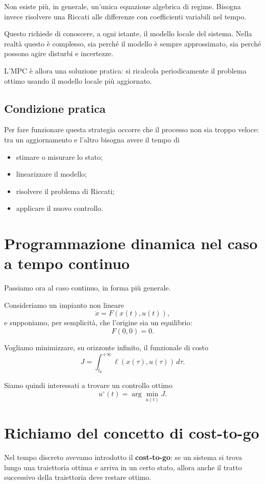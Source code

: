 Non esiste più, in generale, un'unica equazione algebrica di regime.
Bisogna invece risolvere una Riccati alle differenze con coefficienti variabili nel tempo.

Questo richiede di conoscere, a ogni istante, il modello locale del sistema.
Nella realtà questo è complesso, sia perché il modello è sempre approssimato,
sia perché possono agire disturbi e incertezze.

L'MPC è allora una soluzione pratica:
si ricalcola periodicamente il problema ottimo usando il modello locale più aggiornato.

\subsection{Condizione pratica}

Per fare funzionare questa strategia occorre che il processo non sia troppo veloce:
tra un aggiornamento e l'altro bisogna avere il tempo di
\begin{itemize}
    \item stimare o misurare lo stato;
    \item linearizzare il modello;
    \item risolvere il problema di Riccati;
    \item applicare il nuovo controllo.
\end{itemize}

\section{Programmazione dinamica nel caso a tempo continuo}

Passiamo ora al caso continuo, in forma più generale.

Consideriamo un impianto non lineare
\[
\dot x = F(x(t),u(t)),
\]
e supponiamo, per semplicità, che l'origine sia un equilibrio:
\[
F(0,0)=0.
\]

Vogliamo minimizzare, su orizzonte infinito, il funzionale di costo
\[
J=\int_{t_0}^{+\infty} \ell(x(\tau),u(\tau))\,d\tau.
\]

Siamo quindi interessati a trovare un controllo ottimo
\[
u^\circ(t)=\arg\min_{u(t)} J.
\]

\section{Richiamo del concetto di cost-to-go}

Nel tempo discreto avevamo introdotto il \textbf{cost-to-go}:
se un sistema si trova lungo una traiettoria ottima e arriva in un certo stato,
allora anche il tratto successivo della traiettoria deve restare ottimo.

